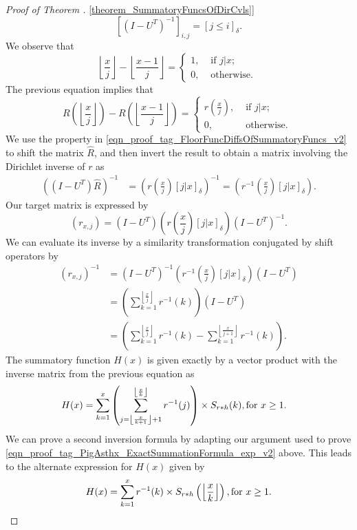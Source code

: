\documentclass[11pt,reqno,a4letter]{article}
\newcommand{\hlocalref}[1]{\hyperref[#1]{\ref{#1}}}
\numberwithin{equation}{section}
\numberwithin{figure}{section}
\numberwithin{table}{section}
\newcommand{\Iverson}[1]{\ensuremath{\left[#1\right]_{\delta}}}
\newcommand{\floor}[1]{\left\lfloor #1 \right\rfloor}
\newcommand{\Floor}[2]{\ensuremath{\left\lfloor \frac{#1}{#2} \right\rfloor}}
\theoremstyle{plain}
\numberwithin{theorem}{section}
\theoremstyle{definition}
\theoremstyle{remark}
\newcommand{\mathtext}[1]{\text{\rm #1}}
\begin{document}
\begin{proof}[Proof of Theorem \hlocalref{theorem_SummatoryFuncsOfDirCvls}]
\[
\left[\left(I - U^T\right)^{-1}\right]_{i,j} = \Iverson{j \leq i}. 
\]
We observe that 
\[
\Floor{x}{j} - \Floor{x-1}{j} = \begin{cases} 
     1, & \text{ if $j|x$; } \\ 
     0, & \text{ otherwise. } 
     \end{cases} 
\] 
The previous equation implies that 
\begin{equation} 
\label{eqn_proof_tag_FloorFuncDiffsOfSummatoryFuncs_v2} 
R\left(\floor{\frac{x}{j}}\right) - R\left(\floor{\frac{x-1}{j}}\right) = 
     \begin{cases} 
     r\left(\frac{x}{j}\right), & \text{ if $j|x$; } \\ 
     0, & \text{ otherwise. } 
     \end{cases}
\end{equation} 
We use the property in \eqref{eqn_proof_tag_FloorFuncDiffsOfSummatoryFuncs_v2} 
to shift the matrix $\hat{R}$, and then invert the result to obtain a matrix involving the 
Dirichlet inverse of $r$ as 
\begin{align*} 
\left(\left(I-U^{T}\right) \hat{R}\right)^{-1} & = 
     \left(r\left(\frac{x}{j}\right) \Iverson{j|x}\right)^{-1} = 
     \left(r^{-1}\left(\frac{x}{j}\right) \Iverson{j|x}\right). 
\end{align*} 
Our target matrix is expressed by 
$$(r_{x,j}) = \left(I-U^{T}\right) \left(r\left(\frac{x}{j}\right) \Iverson{j|x}\right) \left(I-U^{T}\right)^{-1}.$$
We can evaluate its inverse by a similarity transformation conjugated by shift operators by 
\begin{align*} 
(r_{x,j})^{-1} & = \left(I-U^{T}\right)^{-1} \left(r^{-1}\left(\frac{x}{j}\right) 
     \Iverson{j|x}\right) \left(I-U^{T}\right) \\ 
     & = \left(\sum_{k=1}^{\floor{\frac{x}{j}}} r^{-1}(k)\right) \left(I-U^{T}\right) \\ 
     & = \left(\sum_{k=1}^{\floor{\frac{x}{j}}} r^{-1}(k) - \sum_{k=1}^{\floor{\frac{x}{j+1}}} r^{-1}(k)\right). 
\end{align*} 
The summatory function $H(x)$ is given exactly 
by a vector product with the inverse matrix from the previous equation as 
\begin{align*} 
H(x) & = \sum_{k=1}^x \left(\sum_{j=\floor{\frac{x}{k+1}}+1}^{\floor{\frac{x}{k}}} r^{-1}(j)\right) 
	\times S_{r \ast h}(k), \mathtext{ for } x \geq 1. 
\end{align*} 
We can prove a second inversion formula by adapting our argument used to prove 
\eqref{eqn_proof_tag_PigAsthx_ExactSummationFormula_exp_v2} above. 
This leads to the alternate expression for $H(x)$ given by 
\[
H(x) = \sum_{k=1}^{x} r^{-1}(k) \times S_{r \ast h}\left(\Floor{x}{k}\right), 
     \mathtext{ for } x \geq 1. 
     \qedhere 
\]
\end{proof} 
\end{document}
